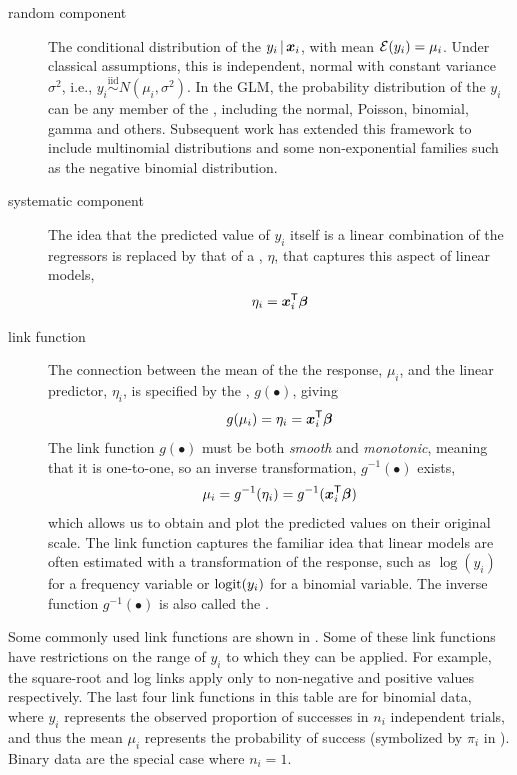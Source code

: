 \documentclass[11pt]{book}\usepackage[]{graphicx}\usepackage[]{color}
\begin{document}
\begin{description}
  \item[random component] The conditional distribution of the $y_i \, | \, \bm{x}_i$,
  with mean $\mathcal{E} (y_i) = \mu_i$. Under classical assumptions,
  this is independent, normal with constant variance $\sigma^2$, i.e.,
  $ y_i \stackrel{\textrm{iid}}{\sim} N (\mu_i, \sigma^2)$.
  In the GLM, the probability distribution of the $y_i$ can be any member of the 
  , including the normal, Poisson, binomial, gamma
  and others. Subsequent work has extended this framework to include
  multinomial distributions and some non-exponential families such as the
  negative binomial distribution.
  
  
  \item[systematic component] The idea that the predicted value of $y_i$ itself
  is a linear
  combination of the regressors is replaced by that of a ,
  $\eta$, that captures this aspect of linear models,
\begin{equation*}
\eta_i = \bm{x}_i^\mathsf{T} \bm{\beta}
\end{equation*}
  
  
  \item[link function] The connection between the mean of the the response, $\mu_i$,
  and the linear predictor, $\eta_i$, is specified by the ,
  $g(\bullet)$, giving
\begin{equation*}
g(\mu_i) = \eta_i = \bm{x}_i^\mathsf{T} \bm{\beta}
\end{equation*}
  The link function $g(\bullet)$ must be both \emph{smooth} and \emph{monotonic}, meaning that
  it is one-to-one, so an inverse transformation, $g^{-1}(\bullet)$ exists, 
\begin{equation*}
\mu_i = g^{-1}(\eta_i) = g^{-1}(\bm{x}_i^\mathsf{T} \bm{\beta})
\end{equation*}
  which allows us to obtain and plot the predicted values on their original scale.  The link function
  captures the familiar idea that linear models are often estimated with a transformation
  of the response, such as $\log(y_i)$ for a frequency variable or $\logit(y_i)$
  for a binomial variable.  The inverse function $g^{-1}(\bullet)$ 
  is also called the . 
\end{description}



Some commonly used link functions are shown in .
Some of these link functions have restrictions on the range of $y_i$
to which they can be applied.  For example, the square-root and log links
apply only to non-negative and
positive values respectively.  
The last four link functions in this
table are for binomial data, where $y_i$ represents the observed proportion
of successes in $n_i$ independent trials, and thus the mean $\mu_i$
represents the probability of success (symbolized by $\pi_i$ in ).
Binary data are the special case where $n_i=1$.
\end{document}
